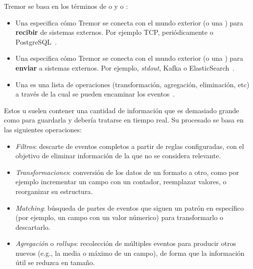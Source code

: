 Tremor se basa en los términos de \onramps o \sources y \offramps o \sinks:

\begin{itemize}
    \item Una \onramp especifica cómo Tremor se conecta con el mundo exterior (o
        una \pipeline) para \textbf{recibir} de sistemas externos. Por ejemplo
        TCP, periódicamente o PostgreSQL~\cite{tremoronramps}.

    \item Una \offramp especifica cómo Tremor se conecta con el mundo exterior
        (o una \pipeline) para \textbf{enviar} a sistemas externos. Por ejemplo,
        \emph{stdout}, Kafka o ElasticSearch~\cite{tremorofframps}.

    \item Una \pipeline es una lista de operaciones (transformación, agregación,
        eliminación, etc) a través de la cual se pueden encaminar los
        eventos~\cite{tremorpipelines}.

\end{itemize}

Estos \onramps u \offramps suelen contener una cantidad de información que es
demasiado grande como para guardarla y debería tratarse en tiempo real. Su
procesado se basa en las siguientes operaciones:

\begin{itemize}
    \item \emph{Filtros}: descarte de eventos completos a partir de reglas
        configuradas, con el objetivo de eliminar información de la \pipeline
        que no se considera relevante.

    \item \emph{Transformaciones}: conversión de los datos de un formato a otro,
        como por ejemplo incrementar un campo con un contador, reemplazar
        valores, o reorganizar su estructura.

    \item \emph{Matching}: búsqueda de partes de eventos que siguen un patrón en
        específico (por ejemplo, un campo  con un valor númerico)
        para transformarlo o descartarlo.

    \item \emph{Agregación} o \emph{rollups}: recolección de múltiples eventos
        para producir otros nuevos (e.g., la media o máximo de un campo), de
        forma que la información útil se reduzca en tamaño.

\end{itemize}

